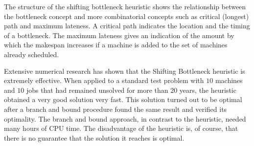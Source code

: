 The structure of the shifting bottleneck heuristic shows the relationship between 
the bottleneck concept and more combinatorial concepts such as critical
(longest) path and maximum lateness. A critical path indicates the location
and the timing of a bottleneck. The maximum lateness gives an indication of
the amount by which the makespan increases if a machine is added to the set
of machines already scheduled.

Extensive numerical research has shown that the Shifting Bottleneck heuristic is extremely 
effective. When applied to a standard test problem with $10$
machines and $10$ jobs that had remained unsolved for more than $20$ years, the
heuristic obtained a very good solution very fast. This solution turned out to
be optimal after a branch and bound procedure found the same result and verified its 
optimality. The branch and bound approach, in contrast to the heuristic,
needed many hours of CPU time. The disadvantage of the heuristic is, of course,
that there is no guarantee that the solution it reaches is optimal.